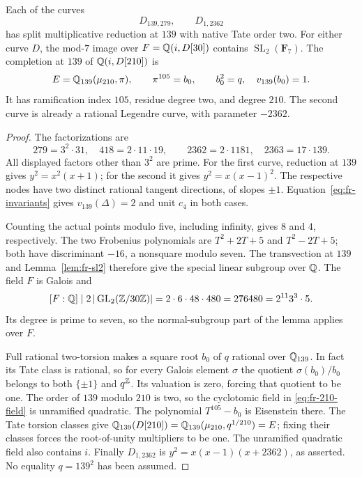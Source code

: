 \begin{proposition}
\label{prop:fr-139}
Each of the curves
\[
 D_{139,279},\qquad D_{1,2362}
\]
has split multiplicative reduction at $139$ with native Tate order
two. For either curve $D$, the mod-$7$ image over
$F=\mathbb Q(i,D[30])$ contains $\operatorname{SL}_2(\mathbf F_7)$.
The completion at $139$ of $\mathbb Q(i,D[210])$ is
\begin{equation}\label{eq:fr-210-field}
 E=\mathbb Q_{139}(\mu_{210},\pi),\qquad
 \pi^{105}=b_0,\qquad b_0^2=q,\quad v_{139}(b_0)=1.
\end{equation}
It has ramification index $105$, residue degree two, and degree $210$.
The second curve is already a rational Legendre curve, with
parameter $-2362$.
\end{proposition}
\begin{proof}
The factorizations are
\[
 279=3^2\cdot31,\quad 418=2\cdot11\cdot19,
 \qquad2362=2\cdot1181,\quad2363=17\cdot139.
\]
All displayed factors other than $3^2$ are prime.
For the first curve, reduction at $139$ gives $y^2=x^2(x+1)$;
for the second it gives $y^2=x(x-1)^2$. The respective nodes have
two distinct rational tangent directions, of slopes $\pm1$.
Equation~\eqref{eq:fr-invariants} gives $v_{139}(\Delta)=2$
and unit $c_4$ in both cases.

Counting the actual points modulo five, including infinity, gives
$8$ and $4$, respectively. The two Frobenius polynomials are
$T^2+2T+5$ and $T^2-2T+5$; both have discriminant $-16$, a
nonsquare modulo seven. The transvection at $139$ and
Lemma~\ref{lem:fr-sl2} therefore give the special linear subgroup
over $\mathbb Q$. The field $F$ is Galois and
\begin{equation}\label{eq:fr-level-degree}
 [F:\mathbb Q]\mid2\,|\operatorname{GL}_2(\mathbb Z/30\mathbb Z)|
       =2\cdot6\cdot48\cdot480=276480=2^{11}3^3\cdot5.
\end{equation}
Its degree is prime to seven, so the normal-subgroup part of the
lemma applies over $F$.

Full rational two-torsion makes a square root $b_0$ of $q$ rational
over $\mathbb Q_{139}$. In fact its Tate class is rational, so for every
Galois element $\sigma$ the quotient $\sigma(b_0)/b_0$ belongs
to both $\{\pm1\}$ and $q^\mathbb Z$. Its valuation is zero, forcing
that quotient to be one. The order of $139$ modulo $210$ is two,
so the cyclotomic field in \eqref{eq:fr-210-field} is unramified
quadratic. The polynomial $T^{105}-b_0$ is Eisenstein there.
The Tate torsion classes give
$\mathbb Q_{139}(D[210])=\mathbb Q_{139}(\mu_{210},q^{1/210})=E$;
fixing their classes forces the root-of-unity multipliers to be
one. The unramified quadratic field also contains $i$. Finally
$D_{1,2362}$ is $y^2=x(x-1)(x+2362)$, as asserted.
No equality $q=139^2$ has been assumed.
\end{proof}

